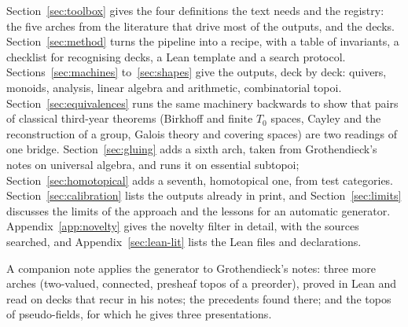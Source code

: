 Section~\ref{sec:toolbox} gives the four definitions the text needs and the registry: the five arches from the literature that drive most of the outputs, and the decks. Section~\ref{sec:method} turns the pipeline into a recipe, with a table of invariants, a checklist for recognising decks, a Lean template and a search protocol. Sections~\ref{sec:machines} to~\ref{sec:shapes} give the outputs, deck by deck: quivers, monoids, analysis, linear algebra and arithmetic, combinatorial topoi. Section~\ref{sec:equivalences} runs the same machinery backwards to show that pairs of classical third-year theorems (Birkhoff and finite $T_0$ spaces, Cayley and the reconstruction of a group, Galois theory and covering spaces) are two readings of one bridge. Section~\ref{sec:gluing} adds a sixth arch, taken from Grothendieck's notes on universal algebra, and runs it on essential subtopoi; Section~\ref{sec:homotopical} adds a seventh, homotopical one, from test categories. Section~\ref{sec:calibration} lists the outputs already in print, and Section~\ref{sec:limits} discusses the limits of the approach and the lessons for an automatic generator. Appendix~\ref{app:novelty} gives the novelty filter in detail, with the sources searched, and Appendix~\ref{sec:lean-lit} lists the Lean files and declarations.

A companion note \cite{bridges-notes} applies the generator to Grothendieck's notes: three more arches (two-valued, connected, presheaf topos of a preorder), proved in Lean and read on decks that recur in his notes; the precedents found there; and the topos of pseudo-fields, for which he gives three presentations.
